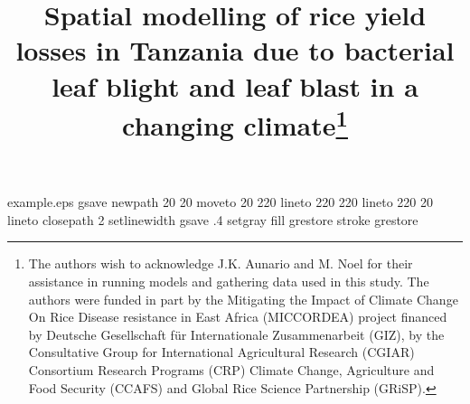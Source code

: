 %
%
%
%
%
\begin{filecontents*}{example.eps}
gsave
newpath
  20 20 moveto
  20 220 lineto
  220 220 lineto
  220 20 lineto
closepath
2 setlinewidth
gsave
  .4 setgray fill
grestore
stroke
grestore
\end{filecontents*}

\RequirePackage{fix-cm}
%
\documentclass[smallcondensed,natbib]{svjour3}     %
%
\smartqed  %
%
\usepackage{graphicx}
%
\usepackage{mathptmx}      %
%
\usepackage{latexsym}
%
%
%


\title{Spatial modelling of rice yield losses in Tanzania due to bacterial leaf blight and leaf blast in a changing climate\thanks{The authors wish to acknowledge J.K. Aunario and M. Noel for their assistance in running models and gathering data used in this study. The authors were funded in part by the Mitigating the Impact of Climate Change On Rice Disease resistance in East Africa (MICCORDEA) project financed by Deutsche Gesellschaft f{\"u}r Internationale Zusammenarbeit (GIZ), by the Consultative Group for International Agricultural Research (CGIAR) Consortium Research Programs (CRP) Climate Change, Agriculture and Food Security (CCAFS) and Global Rice Science Partnership (GRiSP).}}

